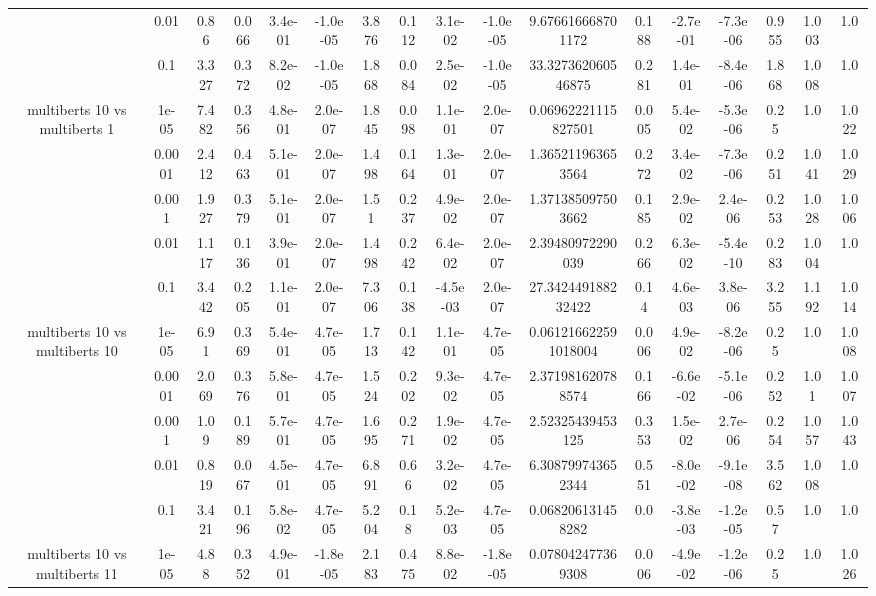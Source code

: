 \begin{tabular}{|c|c|c|c|c|c|c|c|c|c|c|c|c|c|c|c|c|}
 & 0.01 & 0.86 & 0.066 & 3.4e-01 & -1.0e-05 & 3.876 & 0.112 & 3.1e-02 & -1.0e-05 & 9.676616668701172 & 0.188 & -2.7e-01 & -7.3e-06 & 0.955 & 1.003 & 1.0 \\
 & 0.1 & 3.327 & 0.372 & 8.2e-02 & -1.0e-05 & 1.868 & 0.084 & 2.5e-02 & -1.0e-05 & 33.327362060546875 & 0.281 & 1.4e-01 & -8.4e-06 & 1.868 & 1.008 & 1.0 \\
\hline
\multirow{5}{*}{multiberts 10 vs multiberts 1} & 1e-05 & 7.482 & 0.356 & 4.8e-01 & 2.0e-07 & 1.845 & 0.098 & 1.1e-01 & 2.0e-07 & 0.06962221115827501 & 0.005 & 5.4e-02 & -5.3e-06 & 0.25 & 1.0 & 1.022 \\
 & 0.0001 & 2.412 & 0.463 & 5.1e-01 & 2.0e-07 & 1.498 & 0.164 & 1.3e-01 & 2.0e-07 & 1.365211963653564 & 0.272 & 3.4e-02 & -7.3e-06 & 0.251 & 1.041 & 1.029 \\
 & 0.001 & 1.927 & 0.379 & 5.1e-01 & 2.0e-07 & 1.51 & 0.237 & 4.9e-02 & 2.0e-07 & 1.371385097503662 & 0.185 & 2.9e-02 & 2.4e-06 & 0.253 & 1.028 & 1.006 \\
 & 0.01 & 1.117 & 0.136 & 3.9e-01 & 2.0e-07 & 1.498 & 0.242 & 6.4e-02 & 2.0e-07 & 2.39480972290039 & 0.266 & 6.3e-02 & -5.4e-10 & 0.283 & 1.004 & 1.0 \\
 & 0.1 & 3.442 & 0.205 & 1.1e-01 & 2.0e-07 & 7.306 & 0.138 & -4.5e-03 & 2.0e-07 & 27.342449188232422 & 0.14 & 4.6e-03 & 3.8e-06 & 3.255 & 1.192 & 1.014 \\
\hline
\multirow{5}{*}{multiberts 10 vs multiberts 10} & 1e-05 & 6.91 & 0.369 & 5.4e-01 & 4.7e-05 & 1.713 & 0.142 & 1.1e-01 & 4.7e-05 & 0.061216622591018004 & 0.006 & 4.9e-02 & -8.2e-06 & 0.25 & 1.0 & 1.008 \\
 & 0.0001 & 2.069 & 0.376 & 5.8e-01 & 4.7e-05 & 1.524 & 0.202 & 9.3e-02 & 4.7e-05 & 2.371981620788574 & 0.166 & -6.6e-02 & -5.1e-06 & 0.252 & 1.01 & 1.007 \\
 & 0.001 & 1.09 & 0.189 & 5.7e-01 & 4.7e-05 & 1.695 & 0.271 & 1.9e-02 & 4.7e-05 & 2.52325439453125 & 0.353 & 1.5e-02 & 2.7e-06 & 0.254 & 1.057 & 1.043 \\
 & 0.01 & 0.819 & 0.067 & 4.5e-01 & 4.7e-05 & 6.891 & 0.66 & 3.2e-02 & 4.7e-05 & 6.308799743652344 & 0.551 & -8.0e-02 & -9.1e-08 & 3.562 & 1.008 & 1.0 \\
 & 0.1 & 3.421 & 0.196 & 5.8e-02 & 4.7e-05 & 5.204 & 0.18 & 5.2e-03 & 4.7e-05 & 0.068206131458282 & 0.0 & -3.8e-03 & -1.2e-05 & 0.57 & 1.0 & 1.0 \\
\hline
\multirow{5}{*}{multiberts 10 vs multiberts 11} & 1e-05 & 4.88 & 0.352 & 4.9e-01 & -1.8e-05 & 2.183 & 0.475 & 8.8e-02 & -1.8e-05 & 0.078042477369308 & 0.006 & -4.9e-02 & -1.2e-06 & 0.25 & 1.0 & 1.026 \\

\end{tabular}
